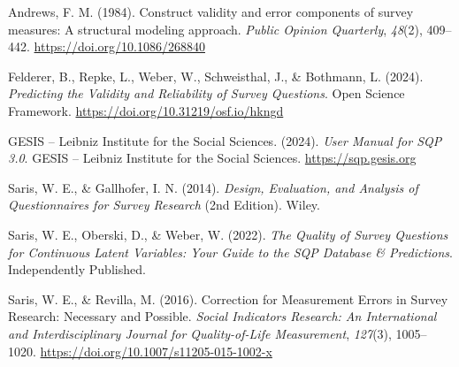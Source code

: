 \documentclass[
  letterpaper,
  DIV=11,
  numbers=noendperiod]{scrartcl}
\newlength{\cslhangindent}
\newenvironment{CSLReferences}[2] %
 {\begin{list}{}{%
  \setlength{\itemindent}{0pt}
  \setlength{\leftmargin}{0pt}
  \setlength{\parsep}{0pt}
  \ifodd #1
   \setlength{\leftmargin}{\cslhangindent}
   \setlength{\itemindent}{-1\cslhangindent}
  \fi
  \setlength{\itemsep}{#2\baselineskip}}}
 {\end{list}}
\begin{document}
\label{refs}
\begin{CSLReferences}{1}{0}
Andrews, F. M. (1984). Construct validity and error components of survey
measures: {A} structural modeling approach. \emph{Public Opinion
Quarterly}, \emph{48}(2), 409--442. \url{https://doi.org/10.1086/268840}

Felderer, B., Repke, L., Weber, W., Schweisthal, J., \& Bothmann, L.
(2024). \emph{Predicting the {Validity} and {Reliability} of {Survey}
{Questions}}. Open Science Framework.
\url{https://doi.org/10.31219/osf.io/hkngd}

GESIS -- Leibniz Institute for the Social Sciences. (2024). \emph{User
{Manual} for {SQP} 3.0}. GESIS -- Leibniz Institute for the Social
Sciences. \url{https://sqp.gesis.org}

Saris, W. E., \& Gallhofer, I. N. (2014). \emph{Design, {Evaluation},
and {Analysis} of {Questionnaires} for {Survey} {Research}} (2nd
Edition). Wiley.

Saris, W. E., Oberski, D., \& Weber, W. (2022). \emph{The {Quality} of
{Survey} {Questions} for {Continuous} {Latent} {Variables}: {Your}
{Guide} to the {SQP} {Database} \& {Predictions}}. Independently
Published.

Saris, W. E., \& Revilla, M. (2016). {Correction for Measurement Errors
in Survey Research: Necessary and Possible}. \emph{Social Indicators
Research: An International and Interdisciplinary Journal for
Quality-of-Life Measurement}, \emph{127}(3), 1005--1020.
\url{https://doi.org/10.1007/s11205-015-1002-x}

\end{CSLReferences}
\end{document}
